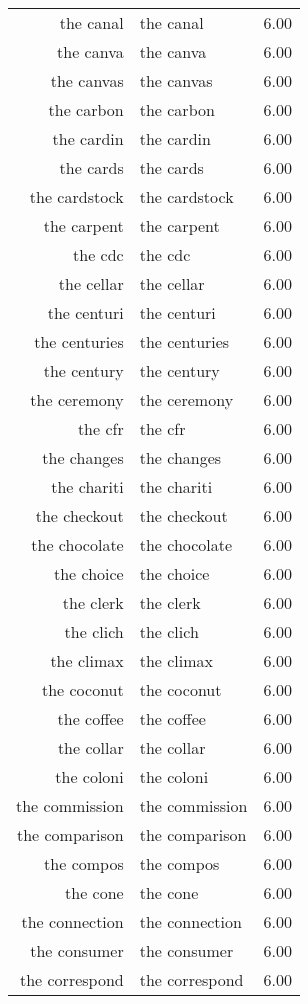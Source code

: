 \begin{table}[ht]
\begin{tabular}{rlr}
  the canal & the canal & 6.00 \\ 
  the canva & the canva & 6.00 \\ 
  the canvas & the canvas & 6.00 \\ 
  the carbon & the carbon & 6.00 \\ 
  the cardin & the cardin & 6.00 \\ 
  the cards & the cards & 6.00 \\ 
  the cardstock & the cardstock & 6.00 \\ 
  the carpent & the carpent & 6.00 \\ 
  the cdc & the cdc & 6.00 \\ 
  the cellar & the cellar & 6.00 \\ 
  the centuri & the centuri & 6.00 \\ 
  the centuries & the centuries & 6.00 \\ 
  the century & the century & 6.00 \\ 
  the ceremony & the ceremony & 6.00 \\ 
  the cfr & the cfr & 6.00 \\ 
  the changes & the changes & 6.00 \\ 
  the chariti & the chariti & 6.00 \\ 
  the checkout & the checkout & 6.00 \\ 
  the chocolate & the chocolate & 6.00 \\ 
  the choice & the choice & 6.00 \\ 
  the clerk & the clerk & 6.00 \\ 
  the clich & the clich & 6.00 \\ 
  the climax & the climax & 6.00 \\ 
  the coconut & the coconut & 6.00 \\ 
  the coffee & the coffee & 6.00 \\ 
  the collar & the collar & 6.00 \\ 
  the coloni & the coloni & 6.00 \\ 
  the commission & the commission & 6.00 \\ 
  the comparison & the comparison & 6.00 \\ 
  the compos & the compos & 6.00 \\ 
  the cone & the cone & 6.00 \\ 
  the connection & the connection & 6.00 \\ 
  the consumer & the consumer & 6.00 \\ 
  the correspond & the correspond & 6.00 \\ 

\end{tabular}
\end{table}
